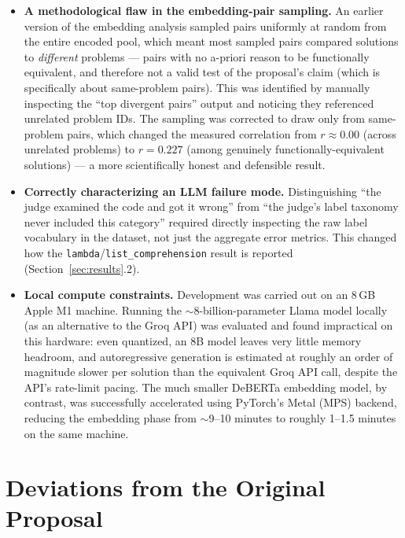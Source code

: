 \documentclass{article}
\begin{document}
\begin{itemize}[leftmargin=*]
\item \textbf{A methodological flaw in the embedding-pair sampling.} An
  earlier version of the embedding analysis sampled pairs uniformly at random
  from the entire encoded pool, which meant most sampled pairs compared
  solutions to \emph{different} problems --- pairs with no a-priori reason to
  be functionally equivalent, and therefore not a valid test of the
  proposal's claim (which is specifically about same-problem pairs). This was
  identified by manually inspecting the ``top divergent pairs'' output and
  noticing they referenced unrelated problem IDs. The sampling was corrected
  to draw only from same-problem pairs, which changed the measured
  correlation from $r \approx 0.00$ (across unrelated problems) to
  $r = 0.227$ (among genuinely functionally-equivalent solutions) --- a more
  scientifically honest and defensible result.

\item \textbf{Correctly characterizing an LLM failure mode.} Distinguishing
  ``the judge examined the code and got it wrong'' from ``the judge's label
  taxonomy never included this category'' required directly inspecting the
  raw label vocabulary in the dataset, not just the aggregate error metrics.
  This changed how the \texttt{lambda}/\texttt{list\_comprehension} result is
  reported (Section~\ref{sec:results}.2).

\item \textbf{Local compute constraints.} Development was carried out on an
  8\,GB Apple M1 machine. Running the $\sim$8-billion-parameter Llama model
  locally (as an alternative to the Groq API) was evaluated and found
  impractical on this hardware: even quantized, an 8B model leaves very
  little memory headroom, and autoregressive generation is estimated at
  roughly an order of magnitude slower per solution than the equivalent Groq
  API call, despite the API's rate-limit pacing. The much smaller DeBERTa
  embedding model, by contrast, was successfully accelerated using PyTorch's
  Metal (MPS) backend, reducing the embedding phase from
  $\sim$9--10 minutes to roughly 1--1.5 minutes on the same machine.

\end{itemize}

\section{Deviations from the Original Proposal}
\end{document}
